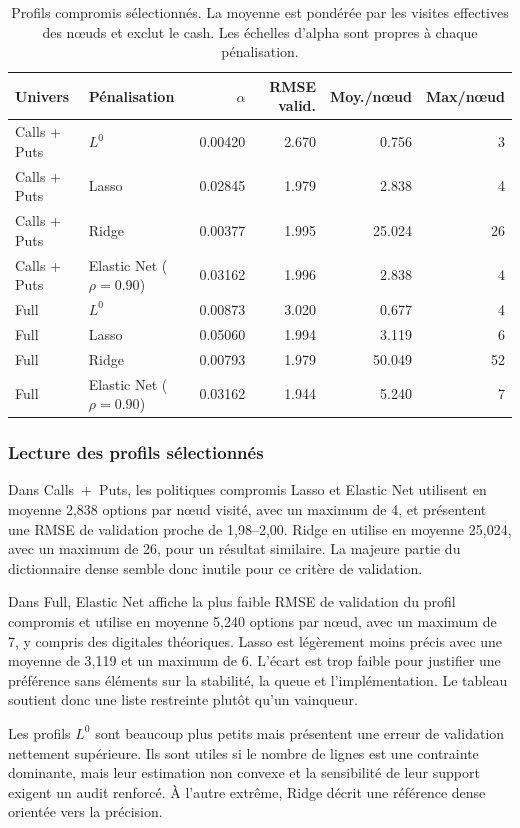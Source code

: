 \begin{table}[htbp]
\centering
\small
\begin{tabular}{llrrrr}
\toprule
Univers & Pénalisation & $\alpha$ & RMSE valid. & Moy./nœud & Max/nœud \\
\midrule
Calls + Puts & $L^0$ & 0.00420 & 2.670 & 0.756 & 3 \\
Calls + Puts & Lasso & 0.02845 & 1.979 & 2.838 & 4 \\
Calls + Puts & Ridge & 0.00377 & 1.995 & 25.024 & 26 \\
Calls + Puts & Elastic Net ($\rho=0.90$) & 0.03162 & 1.996 & 2.838 & 4 \\
Full & $L^0$ & 0.00873 & 3.020 & 0.677 & 4 \\
Full & Lasso & 0.05060 & 1.994 & 3.119 & 6 \\
Full & Ridge & 0.00793 & 1.979 & 50.049 & 52 \\
Full & Elastic Net ($\rho=0.90$) & 0.03162 & 1.944 & 5.240 & 7 \\
\bottomrule
\end{tabular}
\caption{Profils compromis sélectionnés. La moyenne est pondérée par les visites effectives des nœuds et exclut le cash. Les échelles d'alpha sont propres à chaque pénalisation.}
\label{tab:selected}
\end{table}

\subsubsection*{Lecture des profils sélectionnés}

Dans Calls~+~Puts, les politiques compromis Lasso et Elastic Net utilisent en moyenne 2,838 options par nœud visité, avec un maximum de 4, et présentent une RMSE de validation proche de 1,98--2,00. Ridge en utilise en moyenne 25,024, avec un maximum de 26, pour un résultat similaire. La majeure partie du dictionnaire dense semble donc inutile pour ce critère de validation.

Dans Full, Elastic Net affiche la plus faible RMSE de validation du profil compromis et utilise en moyenne 5,240 options par nœud, avec un maximum de 7, y compris des digitales théoriques. Lasso est légèrement moins précis avec une moyenne de 3,119 et un maximum de 6. L'écart est trop faible pour justifier une préférence sans éléments sur la stabilité, la queue et l'implémentation. Le tableau soutient donc une liste restreinte plutôt qu'un vainqueur.

Les profils $L^0$ sont beaucoup plus petits mais présentent une erreur de validation nettement supérieure. Ils sont utiles si le nombre de lignes est une contrainte dominante, mais leur estimation non convexe et la sensibilité de leur support exigent un audit renforcé. À l'autre extrême, Ridge décrit une référence dense orientée vers la précision.


